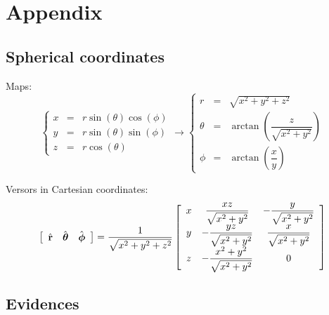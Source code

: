 
\section{Appendix}

\subsection{Spherical coordinates}

Maps:
\begin{equation} \left\{ \begin{array}{rcl} x & = & r \sin(\theta) \cos(\phi) \\ y & = & r \sin(\theta) \sin(\phi) \\ z & = & r \cos(\theta) \end{array}\right. \rightarrow \left\{ \begin{array}{rcl} r & = & \sqrt{x^2+y^2+z^2} \\ \theta & = & \arctan\left(\dfrac{z}{\sqrt{x^2+y^2}}\right) \\ \phi & = & \arctan\left( \dfrac{x}{y} \right) \end{array} \right. \end{equation}

Versors in Cartesian coordinates:
\begin{equation} \left[ \begin{array}{ccc} \hat{\mathbf{r}} & \hat{\boldsymbol{\theta}} & \hat{\boldsymbol{\phi}} \end{array}\right] = \dfrac{1}{\sqrt{x^2+y^2+z^2}} \left[ \begin{array}{ccc} x & \dfrac{xz}{\sqrt{x^2+y^2}} & -\dfrac{y}{\sqrt{x^2+y^2}} \\ y & -\dfrac{yz}{\sqrt{x^2+y^2}} & \dfrac{x}{\sqrt{x^2+y^2}} \\ z & -\dfrac{x^2+y^2}{\sqrt{x^2+y^2}} & 0 \end{array} \right] \end{equation}

\subsection{Evidences}

